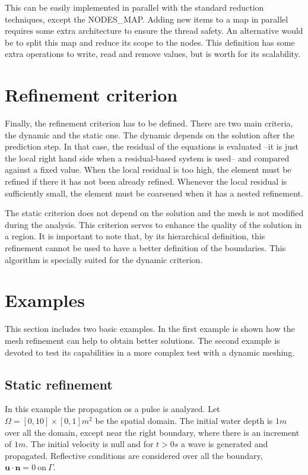 This can be easily implemented in parallel with the standard reduction techniques, except the NODES\_MAP. Adding new items to a map in parallel requires some extra architecture to ensure the thread safety. An alternative would be to split this map and reduce its scope to the nodes. This definition has some extra operations to write, read and remove values, but is worth for its scalability.



\section{Refinement criterion}

Finally, the refinement criterion has to be defined. There are two main criteria, the dynamic and the static one. The dynamic depends on the solution after the prediction step. In that case, the residual of the equations is evaluated --it is just the local right hand side when a residual-based system is used-- and compared against a fixed value. When the local residual is too high, the element must be refined if there it has not been already refined. Whenever the local residual is sufficiently small, the element must be coarsened when it has a nested refinement.

The static criterion does not depend on the solution and the mesh is not modified during the analysis. This criterion serves to enhance the quality of the solution in a region. It is important to note that, by its hierarchical definition,  this refinement cannot be used to have a better definition of the boundaries. This algorithm is specially suited for the dynamic criterion.


\section{Examples}


This section includes two basic examples. In the first example is shown how the mesh refinement can help to obtain better solutions. The second example is devoted to test its capabilities in a more complex test with a dynamic meshing.


\subsection{Static refinement}


In this example the propagation os a pulse is analyzed. Let $\Omega=[0,10]\times[0,1]m^2$ be the spatial domain. The initial water depth is $1m$ over all the domain, except near the right boundary, where there is an increment of $1m$.
The initial velocity is null and for $t>0s$ a wave is generated and propagated. Reflective conditions are considered over all the boundary, $\mathbf{u} \cdot \mathbf{n} = 0\ \text{on}\ \Gamma$.

